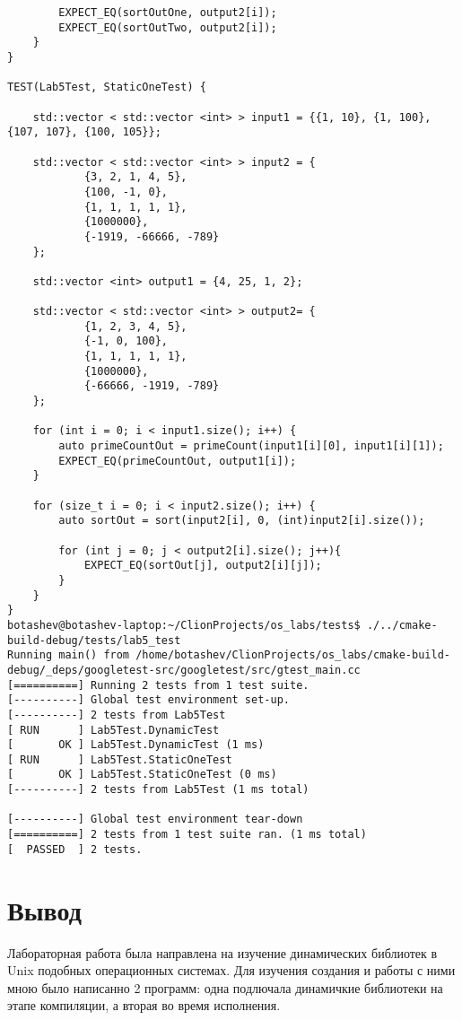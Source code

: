 \documentclass[pdf, unicode, 12pt, a4paper,oneside,fleqn]{article}
\begin{document}
{\begin{verbatim}
        EXPECT_EQ(sortOutOne, output2[i]);
        EXPECT_EQ(sortOutTwo, output2[i]);
    }
}

TEST(Lab5Test, StaticOneTest) {

    std::vector < std::vector <int> > input1 = {{1, 10}, {1, 100}, {107, 107}, {100, 105}};

    std::vector < std::vector <int> > input2 = {
            {3, 2, 1, 4, 5},
            {100, -1, 0},
            {1, 1, 1, 1, 1},
            {1000000},
            {-1919, -66666, -789}
    };

    std::vector <int> output1 = {4, 25, 1, 2};

    std::vector < std::vector <int> > output2= {
            {1, 2, 3, 4, 5},
            {-1, 0, 100},
            {1, 1, 1, 1, 1},
            {1000000},
            {-66666, -1919, -789}
    };

    for (int i = 0; i < input1.size(); i++) {
        auto primeCountOut = primeCount(input1[i][0], input1[i][1]);
        EXPECT_EQ(primeCountOut, output1[i]);
    }

    for (size_t i = 0; i < input2.size(); i++) {
        auto sortOut = sort(input2[i], 0, (int)input2[i].size());

        for (int j = 0; j < output2[i].size(); j++){
            EXPECT_EQ(sortOut[j], output2[i][j]);
        }
    }
}
botashev@botashev-laptop:~/ClionProjects/os_labs/tests$ ./../cmake-build-debug/tests/lab5_test 
Running main() from /home/botashev/ClionProjects/os_labs/cmake-build-debug/_deps/googletest-src/googletest/src/gtest_main.cc
[==========] Running 2 tests from 1 test suite.
[----------] Global test environment set-up.
[----------] 2 tests from Lab5Test
[ RUN      ] Lab5Test.DynamicTest
[       OK ] Lab5Test.DynamicTest (1 ms)
[ RUN      ] Lab5Test.StaticOneTest
[       OK ] Lab5Test.StaticOneTest (0 ms)
[----------] 2 tests from Lab5Test (1 ms total)

[----------] Global test environment tear-down
[==========] 2 tests from 1 test suite ran. (1 ms total)
[  PASSED  ] 2 tests.
\end{verbatim}
}

\pagebreak

\section{Вывод}

Лабораторная работа была направлена на изучение динамических библиотек в Unix подобных операционных
системах. Для изучения создания и работы с ними мною было написанно 2 программ: одна
подлючала динамичкие библиотеки на этапе компиляции, а вторая во время исполнения.
\end{document}
